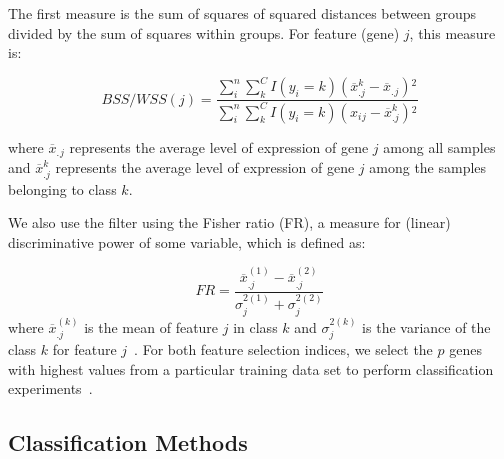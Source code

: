 \documentclass[10pt]{bmc_article}
\newenvironment{bmcformat}{\begin{raggedright}\baselineskip20pt\sloppy\setboolean{publ}{false}}{\end{raggedright}\baselineskip20pt\sloppy}
\begin{document}
\begin{bmcformat}
The first measure is the sum of squares of squared distances between
groups divided by the sum of squares within groups. For feature
(gene) $j$, this measure is:

\begin{equation}
BSS/WSS(j) = \frac{\sum^n_i\sum^C_k I(y_i = k)(\overline{x}^k_{.j} -
\overline{x}{_.}{_j}){^2}} {\sum^n_i\sum^C_k I(y_i =
k)(x{_i}{_j} -\overline{x}^k_{.j}){^2}}
\end{equation}

where $\overline{x}_.$$_j$ represents the average level of expression
of gene $j$ among all samples and $\overline{x}^k_{.j}$ represents the
average level of expression of gene $j$ among the samples belonging to
class $k$.


We also use the filter using the Fisher ratio (FR), a measure for
(linear) discriminative power of some variable, which is defined as:



\begin{equation}
FR = \frac{\overline{x}^{(1)}_{.j} - \overline{x}^{(2)}_{.j}}{\sigma^{2(1)}_{j} +\sigma^{2(2)}_{j} }
\end{equation}
where $\overline{x}^{(k)}_{.j}$ is the mean of feature $j$ in class
$k$ and $\sigma^{2(k)}_{j}$ is the variance of the class $k$ for
feature $j$~\cite{Peng2006}.  For both feature selection indices, we
select the $p$ genes with highest values from a particular training
data set to perform classification experiments~\cite{Dudoit2002}.

\subsection*{Classification Methods}


\end{bmcformat}
\end{document}
